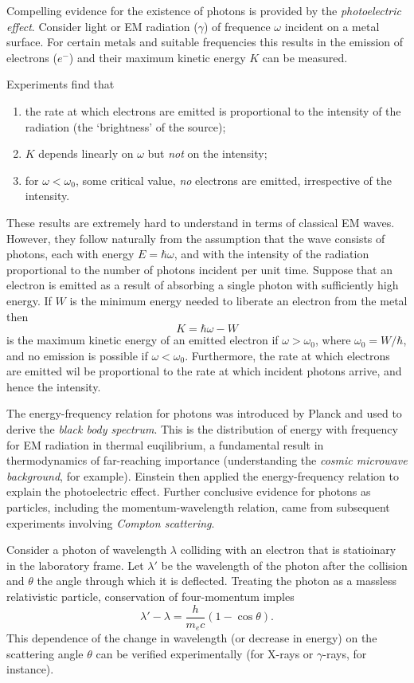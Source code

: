 \documentclass[a4paper]{article}
\theoremstyle{definition}
\begin{document}
Compelling evidence for the existence of photons is provided by the \emph{photoelectric effect}. Consider light or EM radiation ($\gamma$) of frequence $\omega$ incident on a metal surface. For certain metals and suitable frequencies this results in the emission of electrons ($e^-$) and their maximum kinetic energy $K$ can be measured.

Experiments find that
\begin{enumerate}
\item the rate at which electrons are emitted is proportional to the intensity of the radiation (the `brightness' of the source);
\item $K$ depends linearly on $\omega$ but \emph{not} on the intensity;
  \item for $\omega < \omega_0$, some critical value, \emph{no} electrons are emitted, irrespective of the intensity.
\end{enumerate}

These results are extremely hard to understand in terms of classical EM waves. However, they follow naturally from the assumption that the wave consists of photons, each with energy $E=\hbar\omega$, and with the intensity of the radiation proportional to the number of photons incident per unit time. Suppose that an electron is emitted as a result of absorbing a single photon with sufficiently high energy. If $W$ is the minimum energy needed to liberate an electron from the metal then
\[
  K=\hbar\omega-W
\]
is the maximum kinetic energy of an emitted electron if $\omega>\omega_0$, where $\omega_0=W/\hbar$, and no emission is possible if $\omega<\omega_0$. Furthermore, the rate at which electrons are emitted wil be proportional to the rate at which incident photons arrive, and hence the intensity.

The energy-frequency relation for photons was introduced by Planck and used to derive the \emph{black body spectrum}. This is the distribution of energy with frequency for EM radiation in thermal euqilibrium, a fundamental result in thermodynamics of far-reaching importance (understanding the \emph{cosmic microwave background}, for example). Einstein then applied the energy-frequency relation to explain the photoelectric effect. Further conclusive evidence for photons as particles, including the momentum-wavelength relation, came from subsequent experiments involving \emph{Compton scattering}.

Consider a photon of wavelength $\lambda$ colliding with an electron that is statioinary in the laboratory frame. Let $\lambda'$ be the wavelength of the photon after the collision and $\theta$ the angle through which it is deflected. Treating the photon as a massless relativistic particle, conservation of four-momentum imples
\[
  \lambda'-\lambda = \frac{h}{m_e c}(1-\cos \theta).
\]
This dependence of the change in wavelength (or decrease in energy) on the scattering angle $\theta$ can be verified experimentally (for X-rays or $\gamma$-rays, for instance).
\end{document}
